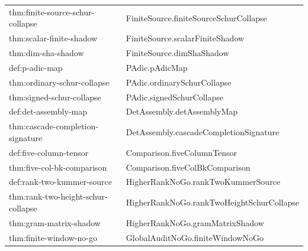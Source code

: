 \begin{small}
\begin{longtable}{@{}>{\ttfamily\raggedright\arraybackslash}p{} >{\ttfamily\raggedright\arraybackslash}p{}@{}}
thm:\allowbreak finite-\allowbreak source-\allowbreak schur-\allowbreak collapse & Finite\allowbreak Source.\allowbreak finite\allowbreak Source\allowbreak Schur\allowbreak Collapse \\
thm:\allowbreak scalar-\allowbreak finite-\allowbreak shadow & Finite\allowbreak Source.\allowbreak scalar\allowbreak Finite\allowbreak Shadow \\
thm:\allowbreak dim-\allowbreak sha-\allowbreak shadow & Finite\allowbreak Source.\allowbreak dim\allowbreak Sha\allowbreak Shadow \\
def:\allowbreak p-\allowbreak adic-\allowbreak map & PAdic.\allowbreak p\allowbreak Adic\allowbreak Map \\
thm:\allowbreak ordinary-\allowbreak schur-\allowbreak collapse & PAdic.\allowbreak ordinary\allowbreak Schur\allowbreak Collapse \\
thm:\allowbreak signed-\allowbreak schur-\allowbreak collapse & PAdic.\allowbreak signed\allowbreak Schur\allowbreak Collapse \\
def:\allowbreak det-\allowbreak assembly-\allowbreak map & Det\allowbreak Assembly.\allowbreak det\allowbreak Assembly\allowbreak Map \\
thm:\allowbreak cascade-\allowbreak completion-\allowbreak signature & Det\allowbreak Assembly.\allowbreak cascade\allowbreak Completion\allowbreak Signature \\
def:\allowbreak five-\allowbreak column-\allowbreak tensor & Comparison.\allowbreak five\allowbreak Column\allowbreak Tensor \\
thm:\allowbreak five-\allowbreak col-\allowbreak bk-\allowbreak comparison & Comparison.\allowbreak five\allowbreak Col\allowbreak Bk\allowbreak Comparison \\
def:\allowbreak rank-\allowbreak two-\allowbreak kummer-\allowbreak source & Higher\allowbreak Rank\allowbreak No\allowbreak Go.\allowbreak rank\allowbreak Two\allowbreak Kummer\allowbreak Source \\
thm:\allowbreak rank-\allowbreak two-\allowbreak height-\allowbreak schur-\allowbreak collapse & Higher\allowbreak Rank\allowbreak No\allowbreak Go.\allowbreak rank\allowbreak Two\allowbreak Height\allowbreak Schur\allowbreak Collapse \\
thm:\allowbreak gram-\allowbreak matrix-\allowbreak shadow & Higher\allowbreak Rank\allowbreak No\allowbreak Go.\allowbreak gram\allowbreak Matrix\allowbreak Shadow \\
thm:\allowbreak finite-\allowbreak window-\allowbreak no-\allowbreak go & Global\allowbreak Audit\allowbreak No\allowbreak Go.\allowbreak finite\allowbreak Window\allowbreak No\allowbreak Go \\

\end{longtable}
\end{small}
